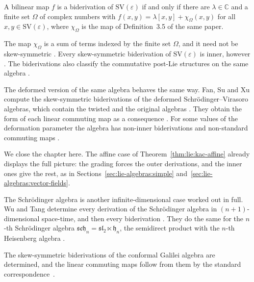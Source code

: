 \begin{theorem}\label{thm:lie:schrodinger-biderivation}
A bilinear map $f$ is a biderivation of $\mathrm{SV}(\varepsilon)$ if and only if
there are $\lambda\in\mathbb{C}$ and a finite set $\Omega$ of complex numbers
with $f(x,y)=\lambda[x,y]+\chi_{\Omega}(x,y)$ for all $x,y\in\mathrm{SV}(\varepsilon)$,
where $\chi_{\Omega}$ is the map of Definition~3.5 of the same paper.
\end{theorem}

The map $\chi_{\Omega}$ is a sum of terms indexed by the finite set $\Omega$,
and it need not be skew-symmetric \cite[p.~9]{Tang2016Schrodinger}. Every
skew-symmetric biderivation of $\mathrm{SV}(\varepsilon)$ is inner, however
\cite[Corollary~3.7, p.~10]{Tang2016Schrodinger}. The biderivations also
classify the commutative post-Lie structures on the same algebra
\cite[Theorem~4.3, p.~12]{Tang2016Schrodinger}.

The deformed version of the same algebra behaves the same way. Fan, Su and
Xu compute the skew-symmetric biderivations of the deformed
Schrödinger--Virasoro algebras, which contain the twisted and the original
algebras \cite[p.~1]{FanSuXu2016}. They obtain the form of each linear commuting
map as a consequence \cite[Theorem~4.3, p.~11]{FanSuXu2016}. For some values of
the deformation parameter the algebra has non-inner biderivations and
non-standard commuting maps \cite[p.~1]{FanSuXu2016}.

We close the chapter here.  The affine case of
Theorem~\ref{thm:lie:kac-affine} already displays the full picture:
the grading forces the outer derivations, and the inner ones give the
rest, as in Sections~\ref{sec:lie-algebras:simple}
and~\ref{sec:lie-algebras:vector-fields}.

The Schr\"odinger algebra is another infinite-dimensional case worked out in
full. Wu and Tang determine every derivation of the Schr\"odinger algebra in
$(n+1)$-dimensional space-time, and then every biderivation
\cite[Abstract]{WuTang2022Schrodinger}. They do the same for the $n$-th
Schr\"odinger algebra $\mathfrak{sch}_n=\mathfrak{sl}_2\ltimes\mathfrak{h}_n$,
the semidirect product with the $n$-th Heisenberg algebra
\cite[Abstract]{WuTang2023NthSchrodinger}.

The skew-symmetric biderivations of the conformal Galilei algebra are determined, and the linear commuting maps follow from them by the standard correspondence~\cite{WlSkew-symmetricBiderivation2023}.


